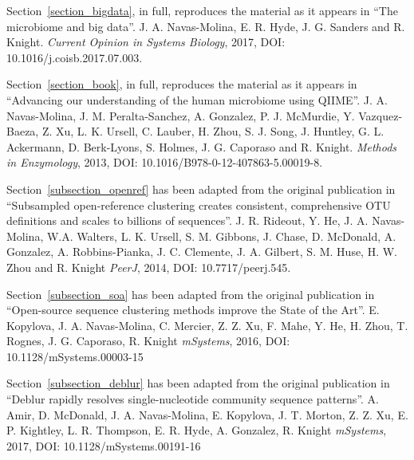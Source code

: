 \begin{frontmatter}
%
%
\begin{acknowledgements}

    Section~\ref{section_bigdata}, in full, reproduces the material as it
    appears in ``The microbiome and big data''. J. A. Navas-Molina, E. R. Hyde,
    J. G. Sanders and R. Knight. \emph{Current Opinion in Systems Biology},
    2017, DOI: 10.1016/j.coisb.2017.07.003.

	Section~\ref{section_book}, in full, reproduces the material as it
    appears in ``Advancing our understanding of the human microbiome using QIIME''.
	J. A. Navas-Molina, J. M. Peralta-Sanchez, A. Gonzalez, P. J. McMurdie,
	Y. Vazquez-Baeza, Z. Xu, L. K. Ursell, C. Lauber, H. Zhou, S. J. Song,
	J. Huntley, G. L. Ackermann, D. Berk-Lyons, S. Holmes, J. G. Caporaso and R.
	Knight. \emph{Methods in Enzymology}, 2013, DOI: 10.1016/B978-0-12-407863-5.00019-8.

    Section~\ref{subsection_openref} has been adapted from the original publication in
    ``Subsampled open-reference clustering creates consistent, comprehensive OTU
    definitions and scales to billions of sequences''. J. R. Rideout, Y. He,
    J. A. Navas-Molina, W.A. Walters, L. K. Ursell, S. M. Gibbons, J. Chase,
    D. McDonald, A. Gonzalez, A. Robbins-Pianka, J. C. Clemente, J. A. Gilbert,
    S. M. Huse, H. W. Zhou and R. Knight \emph{PeerJ}, 2014, DOI: 10.7717/peerj.545.

    Section~\ref{subsection_soa} has been adapted from the original publication in
    ``Open-source sequence clustering methods improve the State of the Art''.
    E. Kopylova, J. A. Navas-Molina, C. Mercier, Z. Z. Xu, F. Mahe, Y. He, H. Zhou,
    T. Rognes, J. G. Caporaso, R. Knight \emph{mSystems}, 2016, DOI: 10.1128/mSystems.00003-15

    Section~\ref{subsection_deblur} has been adapted from the original publication in
    ``Deblur rapidly resolves single-nucleotide community sequence patterns''.
    A. Amir, D. McDonald, J. A. Navas-Molina, E. Kopylova, J. T. Morton, Z. Z. Xu,
    E. P. Kightley, L. R. Thompson, E. R. Hyde, A. Gonzalez, R. Knight \emph{mSystems},
    2017, DOI: 10.1128/mSystems.00191-16


\end{acknowledgements}
\end{frontmatter}
